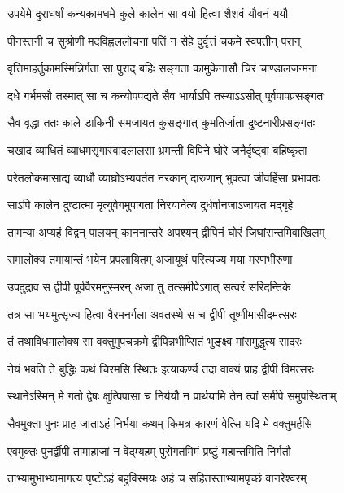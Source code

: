 \twolineshloka
{उपयेमे दुराधर्षां कन्यकामधमे कुले}
{कालेन सा वयो हित्वा शैशवं यौवनं ययौ} %

\twolineshloka
{पीनस्तनी च सुश्रोणी मदविह्वललोचना}
{पतिं न सेहे दुर्वृत्तं चकमे स्वपतीन् परान्} %

\twolineshloka
{वृत्तिमाहर्तुकामस्मिन्निर्गता सा पुराद् बहिः}
{सङ्गता कामुकेनासौ चिरं चाण्डालजन्मना} %

\twolineshloka
{दधे गर्भमसौ तस्मात् सा च कन्योपपद्यते}
{सैव भार्याऽपि तस्याऽऽसीत् पूर्वपापप्रसङ्गतः} %

\twolineshloka
{सैव वृद्धा ततः काले डाकिनी समजायत}
{कुसङ्गात् कुमतिर्जाता दुष्टनारीप्रसङ्गतः} %

\twolineshloka
{चखाद व्याधितं व्याधमसृगास्वादलालसा}
{भ्रमन्ती विपिने घोरे जनैर्दृष्ट्वा बहिष्कृता} %

\twolineshloka
{परेतलोकमासाद्य व्याधौ व्याघ्रोऽभ्यवर्तत}
{नरकान् दारुणान् भुक्त्वा जीवहिंसा प्रभावतः} %

\twolineshloka
{साऽपि कालेन दुष्टात्मा मृत्युवेगमुपागता}
{निरयानेत्य दुर्धर्षानजाऽजायत मद्गृहे} %

\twolineshloka
{तामन्या अप्यहं विद्वन् पालयन् काननान्तरे}
{अपश्यन् द्वीपिनं घोरं जिघांसन्तमिवाखिलम्} %

\twolineshloka
{समालोक्य तमायान्तं भयेन प्रपलायितम्}
{अजायूथं परित्यज्य मया मरणभीरुणा} %

\twolineshloka
{उपदुद्राव स द्वीपी पूर्ववैरमनुस्मरन्}
{अजा तु तत्समीपेऽगात् सत्वरं सरिदन्तिके} %

\twolineshloka
{तत्र सा भयमुत्सृज्य हित्वा वैरमनर्गला}
{अवतस्थे स च द्वीपी तूष्णीमासीदमत्सरः} %

\twolineshloka
{तं तथाविधमालोक्य सा वक्तुमुपचक्रमे}
{द्वीपिन्नभीप्सितं भुङ्क्ष्व मांसमुद्धृत्य सादरः} %

\twolineshloka
{नेयं भवति ते बुद्धिः कथं चिरमसि स्थितः}
{इत्याकर्ण्य तदा वाक्यं प्राह द्वीपी विमत्सरः} %

\twolineshloka
{स्थानेऽस्मिन् मे गतो द्वेषः क्षुत्पिपासा च निर्ययौ}
{न प्रार्थयामि तेन त्वां समीपे समुपस्थिताम्} %

\twolineshloka
{सैवमुक्ता पुनः प्राह जाताऽहं निर्भया कथम्}
{किमत्र कारणं वेत्सि यदि मे वक्तुमर्हसि} %

\twolineshloka
{एवमुक्तः पुनर्द्वीपी तामाहाजां न वेद्म्यहम्}
{पुरोगतमिमं प्रष्टुं महान्तमिति निर्गतौ} %

\twolineshloka
{ताभ्यामुभाभ्यामागत्य पृष्टोऽहं बहुविस्मयः}
{अहं च सहितस्ताभ्यामपृच्छं वानरेश्वरम्} %


